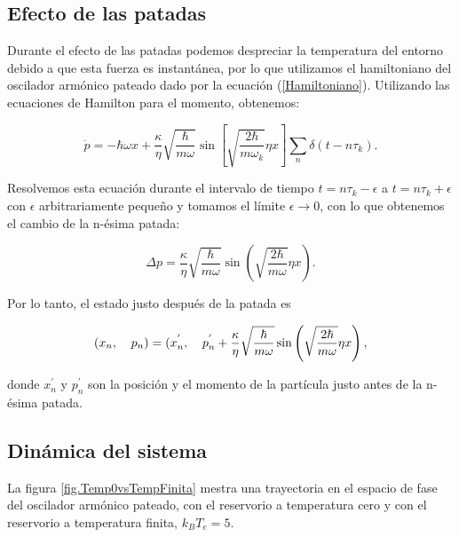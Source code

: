 \documentclass[letterpaper,12pt,oneside]{book}
\begin{document}
	\subsection{Efecto de las patadas}
	
	Durante el efecto de las patadas podemos despreciar la temperatura del entorno debido a que esta fuerza es instant\'anea, por lo que utilizamos el hamiltoniano del oscilador arm\'onico pateado dado por la ecuaci\'on (\ref{Hamiltoniano}). Utilizando las ecuaciones de Hamilton para el momento, obtenemos:
	
	\begin{equation}
		\dot{p} = -\hbar\omega x + \frac{\kappa}{\eta}\sqrt{\frac{\hbar}{m\omega}}\sin \left[ \sqrt{\frac{2\hbar}{m\omega_k}} \eta x\right] \sum_n\delta(t-n\tau_k).
	\end{equation}
	
	Resolvemos esta ecuaci\'on durante el intervalo de tiempo $t=n\tau_k - \epsilon$ a $t=n\tau_k + \epsilon$ con $\epsilon$ arbitrariamente pequeño y tomamos el l\'imite $\epsilon \rightarrow 0$, con lo que obtenemos el cambio de la n-\'esima patada:
	
	\begin{equation}
		\Delta p = \frac{\kappa}{\eta}\sqrt{\frac{\hbar}{m\omega}} \sin \left(\sqrt{\frac{2\hbar}{m\omega}} \eta x \right).
	\end{equation}
	
	Por lo tanto,  el estado justo despu\'es de la patada es
	
	\begin{equation}\label{EfectoPatada}
		(x_n,\verb|  | p_n) = (x_n^{'}, \verb|  | p_n^{'} +  \frac{\kappa}{\eta}\sqrt{\frac{\hbar}{m\omega}} \sin \left(\sqrt{\frac{2\hbar}{m\omega}} \eta x \right),
	\end{equation}
	
	\noindent donde $x_n^{'}$ y $p_n^{'}$ son la posici\'on y el momento de la part\'icula justo antes de la n-\'esima patada.
	
	\subsection{Din\'amica del sistema}
	
	La figura \ref{fig.Temp0vsTempFinita} mestra una trayectoria en el espacio de fase del oscilador arm\'onico pateado, con el reservorio a temperatura cero y con el reservorio a temperatura finita, $k_BT_e = 5$.
	
\end{document}
